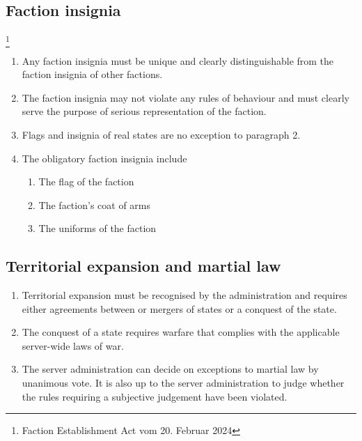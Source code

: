 \documentclass{article}
\begin{document}
\subsection{Faction insignia}\footnote{Faction Establishment Act vom 20. Februar 2024}
\begin{enumerate}[(1)]
    \item Any faction insignia must be unique and clearly distinguishable from the faction insignia of other factions.
    \item The faction insignia may not violate any rules of behaviour and must clearly serve the purpose of serious representation of the faction.
    \item Flags and insignia of real states are no exception to paragraph 2.
    \item The obligatory faction insignia include
    \begin{enumerate}[1.]
        \item The flag of the faction
        \item The faction's coat of arms
        \item The uniforms of the faction
    \end{enumerate}
\end{enumerate}

\subsection{Territorial expansion and martial law}
\begin{enumerate}[(1)]
    \item Territorial expansion must be recognised by the administration and requires either agreements between or mergers of states or a conquest of the state.
    \item The conquest of a state requires warfare that complies with the applicable server-wide laws of war.
    \item The server administration can decide on exceptions to martial law by unanimous vote. It is also up to the server administration to judge whether the rules requiring a subjective judgement have been violated. %
\end{enumerate}
\end{document}
